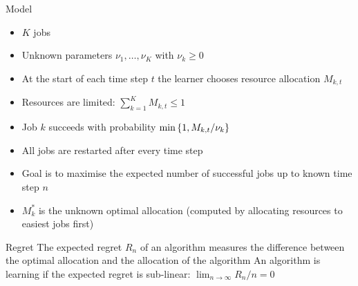 \documentclass[nofooter,landscape,scale=1.4]{poster}
\begin{document}
\begin{frame}
\begin{textblock}{25.33}
\begin{block}{Model}
\begin{itemize}
\item $K$ jobs 
\item Unknown parameters $\nu_1,\ldots,\nu_K$ with $\nu_k \geq 0$
\item At the start of each time step $t$ the learner chooses resource allocation $M_{k,t}$
\item Resources are limited: $\sum_{k=1}^K M_{k,t} \leq 1$
\item Job $k$ succeeds with probability $\min\left\{1, M_{k,t} / \nu_k\right\}$
\end{itemize}
\vspace{0.5cm}
\begin{itemize}
\item All jobs are restarted after every time step
\item Goal is to maximise the expected number of successful jobs up to known time step $n$
\item $M^*_k$ is the unknown optimal allocation (computed by allocating resources to easiest jobs first)
\end{itemize}
\end{block}


\begin{block}{Regret}
\justifying
The expected regret $R_n$ of an algorithm measures the difference between the optimal allocation and the allocation of the algorithm
\eq{
\E\left[\sum_{t=1}^n \sum_{k=1}^K \left( \min\set{1, {M^*_k \over \nu_k}} - \min\set{1, {M_{k,t} \over \nu_k}}\right)\right]
}
An algorithm is learning if the expected regret is sub-linear: $\lim_{n\to\infty} R_n / n = 0$ \\[1cm]


\end{block}
\end{textblock}
\end{frame}
\end{document}
